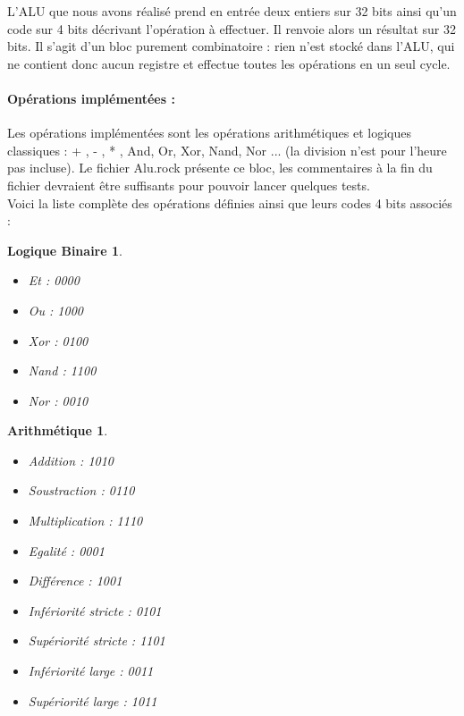 \documentclass[13pt]{article}
\newtheorem{bin}{ \textbf{Logique Binaire} }
\newtheorem{arit}{ \textbf{Arithmétique} }
\begin{document}
L'ALU que nous avons réalisé prend en entrée deux entiers sur 32 bits ainsi 
qu'un code sur 4 bits décrivant l'opération à effectuer. Il renvoie
alors un résultat sur 32 bits. Il s'agit d'un bloc
purement combinatoire : rien n'est stocké dans l'ALU, qui ne contient
donc aucun registre et effectue toutes les opérations en un seul cycle.


\paragraph*{Opérations implémentées :}

Les opérations implémentées sont les opérations arithmétiques et logiques
classiques : + , - , {*} , And, Or, Xor, Nand, Nor ... (la division n'est
pour l'heure pas incluse). Le fichier Alu.rock présente ce bloc, les
commentaires à la fin du fichier devraient être suffisants pour pouvoir
lancer quelques tests.\\


Voici la liste complète des opérations définies ainsi que leurs codes 4 bits associés :\\


\begin{bin}


\begin{itemize}
   \item Et   : 0000
   \item Ou   : 1000
   \item Xor  : 0100
   \item Nand : 1100
   \item Nor  : 0010 
\end{itemize}

\end{bin}

\begin{arit}

\begin{itemize}
   \item Addition       : 1010
   \item Soustraction   : 0110
   \item Multiplication : 1110
   \item Egalité        : 0001
   \item Différence     : 1001
   \item Infériorité stricte : 0101 
   \item Supériorité stricte : 1101
   \item Infériorité large   : 0011
   \item Supériorité large   : 1011 
\end{itemize}

\end{arit}
\end{document}
